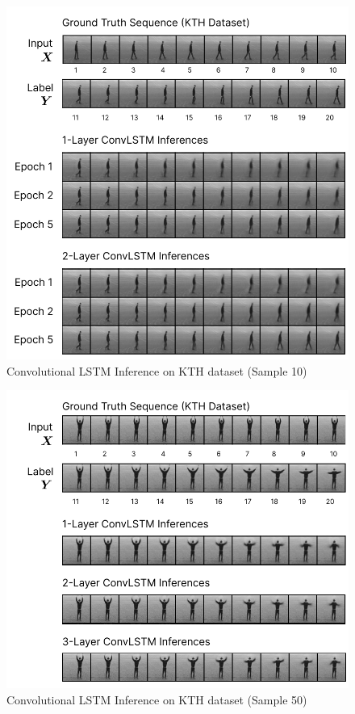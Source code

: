 \documentclass{scrartcl}
\begin{document}
\begin{figure}[H]
	\begin{center}
		\includegraphics[width=1\textwidth]{images/kth/kth_inferences.png}
	\end{center}
	\caption{Convolutional LSTM Inference on KTH dataset (Sample 10)}
	\label{img:lstm_kth_inference}
\end{figure}

\begin{figure}[H]
	\begin{center}
		\includegraphics[width=1\textwidth]{images/kth/kth_inferences_2.png}
	\end{center}
	\caption{Convolutional LSTM Inference on KTH dataset (Sample 50)}
	\label{img:lstm_kth_inference}
\end{figure}
\end{document}

